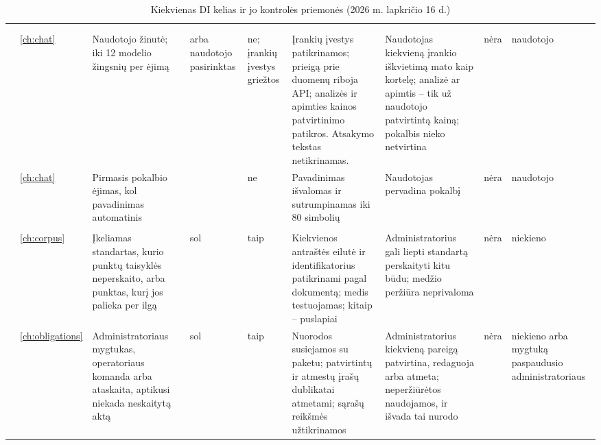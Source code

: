 \begin{landscape}
\setlength{\tabcolsep}{3pt}
\begin{xltabular}{\linewidth}{@{}>{\scriptsize}L{31mm}>{\scriptsize}L{6mm}>{\scriptsize}L{36mm}>{\scriptsize}L{15mm}>{\scriptsize}L{9mm}>{\scriptsize}Y>{\scriptsize}L{38mm}>{\scriptsize}L{19mm}>{\scriptsize}L{25mm}@{}}
\caption{Kiekvienas DI kelias ir jo kontrolės priemonės (2026 m. lapkričio 16 d.)}\label{tab:control:matrix}\\
\toprule
{} &  &  &  &  &  &  &  &  \\
\midrule
\endfirsthead
\toprule
{} &  &  &  &  &  &  &  &  \\
\midrule
\endhead
\bottomrule
\endlastfoot
{} \\
 & \ref{ch:chat} & Naudotojo žinutė; iki 12 modelio žingsnių per ėjimą &  arba naudotojo pasirinktas & ne; įrankių įvestys griežtos & Įrankių įvestys patikrinamos; prieigą prie duomenų riboja API; analizės ir apimties kainos patvirtinimo patikros. Atsakymo tekstas netikrinamas. & Naudotojas kiekvieną įrankio iškvietimą mato kaip kortelę; analizė ar apimtis -- tik už naudotojo patvirtintą kainą; pokalbis nieko netvirtina & nėra & naudotojo \\
 & \ref{ch:chat} & Pirmasis pokalbio ėjimas, kol pavadinimas automatinis &  & ne & Pavadinimas išvalomas ir sutrumpinamas iki 80 simbolių & Naudotojas pervadina pokalbį & nėra & naudotojo \\
\midrule
{} \\
 & \ref{ch:corpus} & Įkeliamas standartas, kurio punktų taisyklės neperskaito, arba punktas, kurį jos palieka per ilgą & sol & taip & Kiekvienos antraštės eilutė ir identifikatorius patikrinami pagal dokumentą; medis testuojamas; kitaip -- puslapiai & Administratorius gali liepti standartą perskaityti kitu būdu; medžio peržiūra neprivaloma & nėra & niekieno \\
 & \ref{ch:obligations} & Administratoriaus mygtukas, operatoriaus komanda arba ataskaita, aptikusi niekada neskaitytą aktą & sol & taip & Nuorodos susiejamos su paketu; patvirtintų ir atmestų įrašų dublikatai atmetami; sąrašų reikšmės užtikrinamos & Administratorius kiekvieną pareigą patvirtina, redaguoja arba atmeta; neperžiūrėtos naudojamos, ir išvada tai nurodo & nėra & niekieno arba mygtuką paspaudusio administratoriaus \\

\end{xltabular}
\end{landscape}
